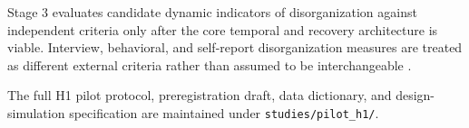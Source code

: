 Stage 3 evaluates candidate dynamic indicators of disorganization against independent criteria only after the core temporal and recovery architecture is viable. Interview, behavioral, and self-report disorganization measures are treated as different external criteria rather than assumed to be interchangeable \parencite{pollard2023disorganized}.

The full H1 pilot protocol, preregistration draft, data dictionary, and design-simulation specification are maintained under \texttt{studies/pilot\_h1/}.

